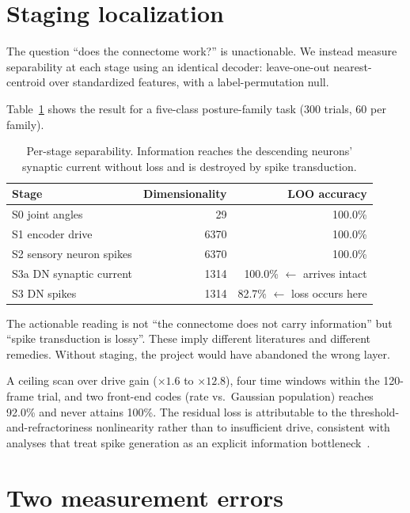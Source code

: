 \documentclass[11pt]{article}
\begin{document}
\section{Staging localization}
\label{sec:staging}

The question ``does the connectome work?'' is unactionable. We instead measure
separability at each stage using an identical decoder: leave-one-out
nearest-centroid over standardized features, with a label-permutation null.

Table~\ref{tab:staging} shows the result for a five-class posture-family task
(300 trials, 60 per family).

\begin{table}[h]
\centering
\begin{tabular}{@{}lrr@{}}
\toprule
Stage & Dimensionality & LOO accuracy \\
\midrule
S0 joint angles                & 29    & 100.0\% \\
S1 encoder drive               & 6370  & 100.0\% \\
S2 sensory neuron spikes       & 6370  & 100.0\% \\
S3a DN synaptic current        & 1314  & 100.0\% \quad $\leftarrow$ arrives intact \\
S3  DN spikes                  & 1314  & 82.7\% \quad $\leftarrow$ loss occurs here \\
\bottomrule
\end{tabular}
\caption{Per-stage separability. Information reaches the descending neurons'
synaptic current without loss and is destroyed by spike transduction.}
\label{tab:staging}
\end{table}

The actionable reading is not ``the connectome does not carry information'' but
``spike transduction is lossy''. These imply different literatures and different
remedies. Without staging, the project would have abandoned the wrong layer.

A ceiling scan over drive gain ($\times 1.6$ to $\times 12.8$), four time
windows within the 120-frame trial, and two front-end codes (rate vs.\ Gaussian
population) reaches 92.0\% and never attains 100\%. The residual loss is
attributable to the threshold-and-refractoriness nonlinearity rather than to
insufficient drive, consistent with analyses that treat spike generation as an
explicit information bottleneck~\cite{snrib}.

\section{Two measurement errors}
\label{sec:errors}
\end{document}
